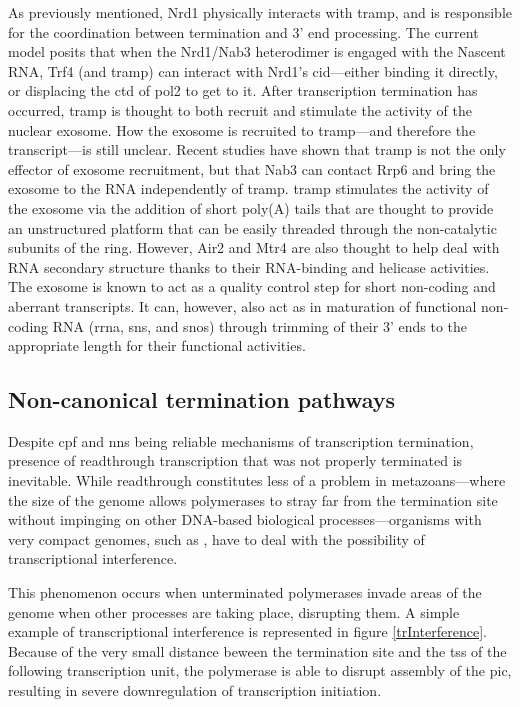 As previously mentioned, Nrd1 physically interacts with \gls{tramp}, and is responsible for the coordination between termination and 3' end processing.
The current model posits that when the Nrd1/Nab3 heterodimer is engaged with the Nascent RNA, Trf4 (and \gls{tramp}) can interact with Nrd1's \gls{cid}---either binding it directly, or displacing the \gls{ctd} of \gls{pol2} to get to it\cite{tudek:2014:molecular}.
After transcription termination has occurred, \gls{tramp} is thought to both recruit and stimulate the activity of the nuclear exosome.
How the exosome is recruited to \gls{tramp}---and therefore the transcript---is still unclear.
Recent studies have shown that \gls{tramp} is not the only effector of exosome recruitment, but that Nab3 can contact Rrp6 and bring the exosome to the RNA independently of \gls{tramp}.
\gls{tramp} stimulates the activity of the exosome via the addition of short poly(A) tails that are thought to provide an unstructured platform that can be easily threaded through the non-catalytic subunits of the ring. 
However, Air2 and Mtr4 are also thought to help deal with RNA secondary structure thanks to their RNA-binding and helicase activities.  
The exosome is known to act as a quality control step for short non-coding and aberrant transcripts.
It can, however, also act as in maturation of functional non-coding RNA (\gls{rrna}, \gls{sns}, and \gls{snos}) through trimming of their 3' ends to the appropriate length for their functional activities.

\subsection{Non-canonical termination pathways}

Despite \gls{cpf} and \gls{nns} being reliable mechanisms of transcription termination, presence of readthrough transcription that was not properly terminated is inevitable.
While readthrough constitutes less of a problem in metazoans---where the size of the genome allows polymerases to stray far from the termination site without impinging on other DNA-based biological processes---organisms with very compact genomes, such as \cer{}, have to deal with the possibility of transcriptional interference.

This phenomenon occurs when unterminated polymerases invade areas of the genome when other processes are taking place, disrupting them.
A simple example of transcriptional interference is represented in figure \ref{trInterference}.
Because of the very small distance beween the termination site and the \gls{tss} of the following transcription unit, the polymerase is able to disrupt assembly of the \gls{pic}, resulting in severe downregulation of transcription initiation.

